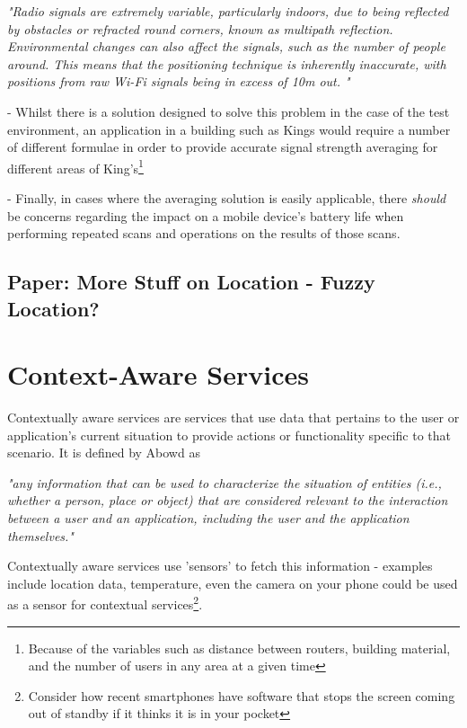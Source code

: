 \documentclass[11pt]{informatics-report}
\begin{document}
\textit{"Radio signals are extremely variable, particularly indoors, due to being reflected by obstacles or refracted round corners, known as multipath reflection. Environmental changes can also affect the signals, such as the number of people around. This means that the positioning technique is inherently inaccurate, with positions from raw Wi-Fi signals being in excess of 10m out. "}\cite{cook2005indoor}

\noindent- Whilst there is a solution designed to solve this problem in the case of the test environment, an application in a building such as Kings would require a number of different formulae in order to provide accurate signal strength averaging for different areas of King's\footnote{ Because of the variables such as distance between routers, building material, and the number of users in any area at a given time}

\noindent- Finally, in cases where the averaging solution is easily applicable, there \textit{should} be concerns regarding the impact on a mobile device's battery life when performing repeated scans and operations on the results of those scans.

\subsection{Paper: More Stuff on Location - Fuzzy Location?} 

\section{Context-Aware Services}

Contextually aware services are services that use data that pertains to the user or application's current situation to provide actions or functionality specific to that scenario. It is defined by Abowd as 

\textit{ "any information that can be used to characterize the situation of entities (i.e., whether a person, place or object) that are considered relevant to the interaction between a user and an application, including the user and the application themselves." }\cite{abowd1999towards}

Contextually aware services use 'sensors' to fetch this information - examples include location data, temperature, even the camera on your phone could be used as a sensor for contextual services\footnote{Consider how recent smartphones have software that stops the screen coming out of standby if it thinks it is in your pocket}.
\end{document}
